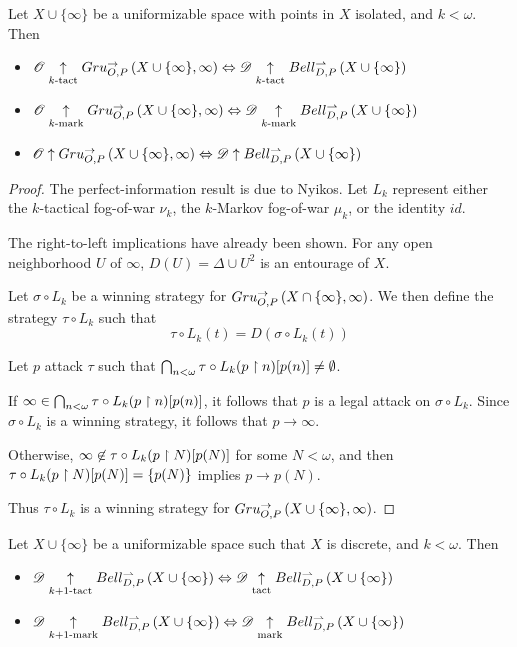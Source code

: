 \begin{thm}
  Let $X\cup\{\infty\}$ be a uniformizable space with points in $X$ isolated,
  and $k<\omega$. Then
  \begin{itemize}
    \item
      $
        \mathscr{O}\underset{k\text{-tact}}{\uparrow} Gru_{O,P}^{\to}\left({X\cup\{\infty\}},{\infty}\right)
          \Leftrightarrow
        \mathscr{D} \underset{k\text{-tact}}{\uparrow} Bell_{D,P}^{\rightharpoonup}\left({X\cup\{\infty\}}\right)
      $
    \item
      $
        \mathscr{O}\underset{k\text{-mark}}{\uparrow} Gru_{O,P}^{\to}\left({X\cup\{\infty\}},{\infty}\right)
          \Leftrightarrow
        \mathscr{D} \underset{k\text{-mark}}{\uparrow} Bell_{D,P}^{\rightharpoonup}\left({X\cup\{\infty\}}\right)
      $
    \item
      $
        \mathscr{O}\uparrow Gru_{O,P}^{\to}\left({X\cup\{\infty\}},{\infty}\right)
          \Leftrightarrow
        \mathscr{D} \uparrow Bell_{D,P}^{\rightharpoonup}\left({X\cup\{\infty\}}\right)
      $
  \end{itemize}
\end{thm}

\begin{proof}
  The perfect-information result is due to Nyikos.
  Let $L_k$ represent either the $k$-tactical fog-of-war $\nu_k$,
  the $k$-Markov fog-of-war $\mu_k$, or the identity $id$.

  The right-to-left implications have already been shown.
  For any open neighborhood $U$ of $\infty$,
  $D(U)=\Delta\cup U^2$ is an entourage of $X$.

  Let $\sigma\circ{L}_k$ be a winning strategy for
  $Gru_{O,P}^{\to}\left({X\cap\{\infty\}},{\infty}\right)$.
  We then define the strategy $\tau\circ L_k$ such that
    \[
      \tau\circ{L}_k(t) = D(\sigma\circ{L}_k(t))
    \]

  Let $p$ attack $\tau$ such that
  $\bigcap_{n<\omega}\tau\circ{L}_k(p\restriction n)[p(n)]\not=\emptyset$.

  If $\infty\in\bigcap_{n<\omega}\tau\circ{L}_k(p\restriction n)[p(n)]$, it follows
  that $p$ is a legal attack on $\sigma\circ{L}_k$. Since $\sigma\circ{L}_k$
  is a winning strategy, it follows that $p\to\infty$.

  Otherwise, $\infty\not\in\tau\circ{L}_k(p\restriction N)[p(N)]$ for some $N<\omega$,
  and then
  $\tau\circ{L}_k(p\restriction N)[p(N)]=\{p(N)\}$ implies $p\to p(N)$.

  Thus $\tau\circ L_k$ is a winning strategy for
  $Gru_{O,P}^{\to}\left({X\cup\{\infty\}},{\infty}\right)$.
\end{proof}

\begin{cor}
  Let $X\cup\{\infty\}$ be a uniformizable space such that $X$ is discrete,
  and $k<\omega$. Then
  \begin{itemize}
    \item
      $
        \mathscr{D}\underset{k+1\text{-tact}}{\uparrow}Bell_{D,P}^{\rightharpoonup}\left({X\cup\{\infty\}}\right)
          \Leftrightarrow
        \mathscr{D}\underset{\text{tact}}{\uparrow}Bell_{D,P}^{\rightharpoonup}\left({X\cup\{\infty\}}\right)
      $
    \item
      $
        \mathscr{D}\underset{k+1\text{-mark}}{\uparrow}Bell_{D,P}^{\rightharpoonup}\left({X\cup\{\infty\}}\right)
          \Leftrightarrow
        \mathscr{D}\underset{\text{mark}}{\uparrow}Bell_{D,P}^{\rightharpoonup}\left({X\cup\{\infty\}}\right)
      $
  \end{itemize}
\end{cor}

